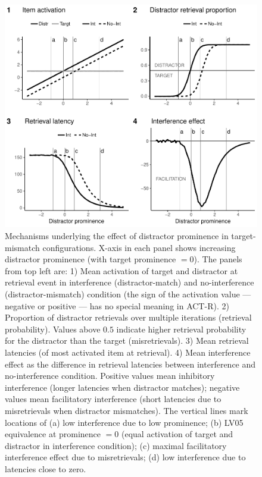 \documentclass{cambridge7A}\usepackage[]{graphicx}\usepackage[]{color}
\begin{document}
\begin{figure}[!htbp]
\centering
%
\includegraphics[width=\textwidth]{figures/ensemble-lines-mismatch}
%
 \caption{Mechanisms underlying the effect of distractor prominence in target-mismatch configurations. 
 	X-axis in each panel shows increasing distractor prominence (with target prominence $=0$).
 	The panels from top left are:
 		1) Mean activation of target and distractor at retrieval event in interference (distractor-match) and no-interference (distractor-mismatch) condition (the sign of the activation value --- negative or positive --- has no special meaning in ACT-R).
 		2) Proportion of distractor retrievals over multiple iterations (retrieval probability). Values above $0.5$ indicate higher retrieval probability for the distractor than the target (misretrievals).
 		3) Mean retrieval latencies (of most activated item at retrieval).
 		4) Mean interference effect as the difference in retrieval latencies between interference and no-interference condition. Positive values mean inhibitory interference (longer latencies when distractor matches); negative values mean facilitatory interference (short latencies due to misretrievals when distractor mismatches).
 	The vertical lines mark locations of 
 		(a) low interference due to low prominence;
 		(b) LV05 equivalence at prominence $=0$ (equal activation of target and distractor in interference condition);
 		(c) maximal facilitatory interference effect due to misretrievals;
 		(d) low interference due to latencies close to zero.
 		}
 \label{fig:promEnsMismatch} 
\end{figure}
\end{document}
